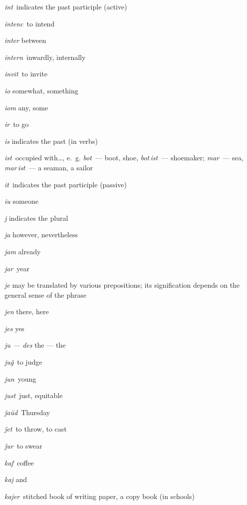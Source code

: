 \begin{landscape}
\begin{multicols}{5}
\begin{outdent}{1em}
\emph{int\,} indicates the past participle (active)

\emph{intenc\,} to intend

\emph{inter} between

\emph{intern\,} inwardly, internally

\emph{invit\,} to invite

\emph{io} somewhat, something

\emph{iom} any, some

\emph{ir\,} to go

\emph{is} indicates the past (in verbs)

\emph{ist\,} occupied with…, e.~g. \emph{bot\,} — boot, shoe, \emph{bot\,ist\,} — shoemaker; \emph{mar\,} — sea, \emph{mar\,ist\,} — a seaman, a sailor

\emph{it\,} indicates the past participle (passive)

\emph{iu} someone
\end{outdent}


\begin{outdent}{1em}
\emph{j} indicates the plural

\emph{ja} however, nevertheless

\emph{jam} already

\emph{jar\,} year

\emph{je} may be translated by various prepositions; its signification depends on the general sense of the phrase

\emph{jen} there, here

\emph{jes} yes

\emph{ju — des} the — the

\emph{juĝ\,} to judge

\emph{jun\,} young

\emph{just\,} just, equitable


\emph{ĵaŭd\,} Thursday

\emph{ĵet\,} to throw, to cast

\emph{ĵur\,} to swear
\end{outdent}


\begin{outdent}{1em}
\emph{kaf\,} coffee

\emph{kaj} and

\emph{kajer\,} stitched book of writing paper, a copy book (in schools)


\end{outdent}
\end{multicols}
\end{landscape}
